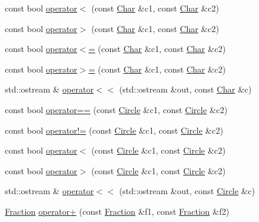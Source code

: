 \begin{DoxyCompactItemize}
\item 
const bool \hyperlink{namespaceprism_a2fc3e64ba36a16f24cb0ae387c83f35f}{operator$<$} (const \hyperlink{classprism_1_1_char}{Char} \&c1, const \hyperlink{classprism_1_1_char}{Char} \&c2)
\item 
const bool \hyperlink{namespaceprism_ab8a312729c4c9ae72836d0034a6f0758}{operator$>$} (const \hyperlink{classprism_1_1_char}{Char} \&c1, const \hyperlink{classprism_1_1_char}{Char} \&c2)
\item 
const bool \hyperlink{namespaceprism_a87d86e9266469c8a40537e12a560b066}{operator$<$=} (const \hyperlink{classprism_1_1_char}{Char} \&c1, const \hyperlink{classprism_1_1_char}{Char} \&c2)
\item 
const bool \hyperlink{namespaceprism_aad049ddef9beb3fec3e7057a7f651280}{operator$>$=} (const \hyperlink{classprism_1_1_char}{Char} \&c1, const \hyperlink{classprism_1_1_char}{Char} \&c2)
\item 
std\+::ostream \& \hyperlink{namespaceprism_aa67ea1154a35dabe9c2c232aff65e930}{operator$<$$<$} (std\+::ostream \&out, const \hyperlink{classprism_1_1_char}{Char} \&c)
\item 
const bool \hyperlink{namespaceprism_a0ce1ad6e6392618212d5ab3bebb8e585}{operator==} (const \hyperlink{classprism_1_1_circle}{Circle} \&c1, const \hyperlink{classprism_1_1_circle}{Circle} \&c2)
\item 
const bool \hyperlink{namespaceprism_a58cbf7ef406800002b446a0f1e917745}{operator!=} (const \hyperlink{classprism_1_1_circle}{Circle} \&c1, const \hyperlink{classprism_1_1_circle}{Circle} \&c2)
\item 
const bool \hyperlink{namespaceprism_a8e662d15b162ca76912c491798caefd3}{operator$<$} (const \hyperlink{classprism_1_1_circle}{Circle} \&c1, const \hyperlink{classprism_1_1_circle}{Circle} \&c2)
\item 
const bool \hyperlink{namespaceprism_a671739ac8567654dba563c34af92213f}{operator$>$} (const \hyperlink{classprism_1_1_circle}{Circle} \&c1, const \hyperlink{classprism_1_1_circle}{Circle} \&c2)
\item 
std\+::ostream \& \hyperlink{namespaceprism_aa63d3d39d3fad8fa5c5966cc4f306324}{operator$<$$<$} (std\+::ostream \&out, const \hyperlink{classprism_1_1_circle}{Circle} \&c)
\item 
\hyperlink{classprism_1_1_fraction}{Fraction} \hyperlink{namespaceprism_ac1b5b2765c314b2baa2dba5c57419829}{operator+} (const \hyperlink{classprism_1_1_fraction}{Fraction} \&f1, const \hyperlink{classprism_1_1_fraction}{Fraction} \&f2)

\end{DoxyCompactItemize}
